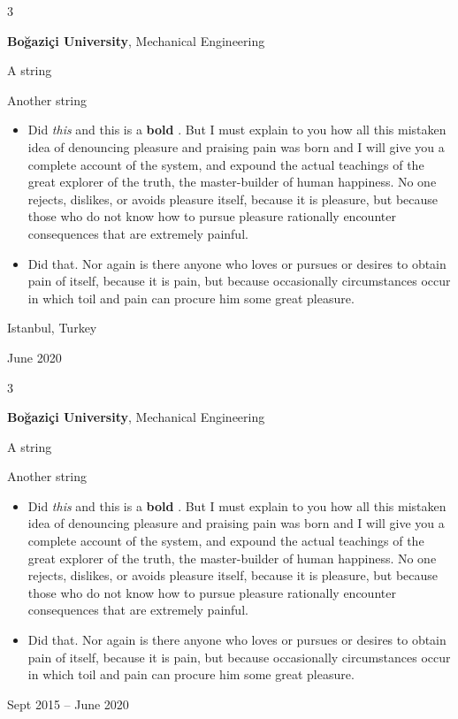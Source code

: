 \documentclass[10pt, letterpaper]{article}
\newenvironment{summary}{
    \begin{description}[
        topsep=0.10 cm,
        parsep=0.10 cm,
        partopsep=0pt,
        itemsep=0pt,
        leftmargin=0.4 cm + 10pt
    ]
}{
    \end{description}
} %
\newenvironment{highlights}{
    \begin{itemize}[
        topsep=0.10 cm,
        parsep=0.10 cm,
        partopsep=0pt,
        itemsep=0pt,
        leftmargin=0.4 cm + 10pt
    ]
}{
    \end{itemize}
} %
\newenvironment{threecolentry}[3][]{
    \onecolentry
    \def\thirdColumn{#3}
    \setcolumnwidth{1 cm, \fill, 4.5 cm}
    \begin{paracol}{3}
    {\raggedright #2} \switchcolumn
}{
    \switchcolumn \raggedleft \thirdColumn
    \end{paracol}
    \endonecolentry
} %
\let\hrefWithoutArrow\href
\renewcommand{\href}[2]{\hrefWithoutArrow{#1}{\ifthenelse{\equal{#2}{}}{ }{#2 }\raisebox{.15ex}{\footnotesize \faExternalLink*}}}
\begin{document}
        \begin{threecolentry}{\textbf{}}{
            Istanbul, Turkey

        June 2020
        }
            \textbf{Boğaziçi University}, Mechanical Engineering
            \begin{summary}
                \item A string
                \item Another string
            \end{summary}
            \begin{highlights}
                \item Did \textit{this} and this is a \textbf{bold} \href{https://example.com}{link}. But I must explain to you how all this mistaken idea of denouncing pleasure and praising pain was born and I will give you a complete account of the system, and expound the actual teachings of the great explorer of the truth, the master-builder of human happiness. No one rejects, dislikes, or avoids pleasure itself, because it is pleasure, but because those who do not know how to pursue pleasure rationally encounter consequences that are extremely painful.
                \item Did that. Nor again is there anyone who loves or pursues or desires to obtain pain of itself, because it is pain, but because occasionally circumstances occur in which toil and pain can procure him some great pleasure.
            \end{highlights}
        \end{threecolentry}

        \vspace{0.2 cm}

        \begin{threecolentry}{\textbf{}}{
            Sept 2015 – June 2020
        }
            \textbf{Boğaziçi University}, Mechanical Engineering
            \begin{summary}
                \item A string
                \item Another string
            \end{summary}
            \begin{highlights}
                \item Did \textit{this} and this is a \textbf{bold} \href{https://example.com}{link}. But I must explain to you how all this mistaken idea of denouncing pleasure and praising pain was born and I will give you a complete account of the system, and expound the actual teachings of the great explorer of the truth, the master-builder of human happiness. No one rejects, dislikes, or avoids pleasure itself, because it is pleasure, but because those who do not know how to pursue pleasure rationally encounter consequences that are extremely painful.
                \item Did that. Nor again is there anyone who loves or pursues or desires to obtain pain of itself, because it is pain, but because occasionally circumstances occur in which toil and pain can procure him some great pleasure.
            \end{highlights}
        \end{threecolentry}
\end{document}
